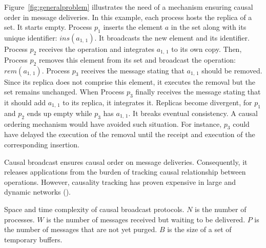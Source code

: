 Figure~\ref{fig:generalproblem} illustrates the need of a mechanism ensuring
causal order in message deliveries. %
In this example, each process hosts the replica of a set. It starts
empty. Process $p_1$ inserts the element $a$ in the set along with its unique
identifier: $ins(a_{1,\,1})$. It broadcasts the new element and its
identifier. Process $p_2$ receives the operation and integrates $a_{1,\,1}$ to
its own copy. Then, Process $p_2$ removes this element from its set and
broadcast the operation: $rem(a_{1,\,1})$. Process $p_3$ receives the message
stating that $a_{1,\,1}$ should be removed. Since its replica does not comprise
this element, it executes the removal but the set remains unchanged. When
Process $p_3$ finally receives the message stating that it should add
$a_{1,\,1}$ to its replica, it integrates it. Replicas become divergent, for
$p_1$ and $p_2$ ends up empty while $p_3$ has $a_{1,\,1}$. It breaks eventual
consistency. A causal ordering mechanism would have avoided such situation. For
instance, $p_3$ could have delayed the execution of the removal until the
receipt and execution of the corresponding insertion.

Causal broadcast ensures causal order on message deliveries. Consequently, it
releases applications from the burden of tracking causal relationship between
operations. However, causality tracking has proven expensive in large and
dynamic networks (\REF).

\begin{table}
  \caption{\label{table:comparison} Space and time complexity of causal broadcast protocols. $N$ is the number of processes. $W$ is the number of messages received but waiting to be delivered.
    $P$ is the number of messages that are not yet purged.
    $B$ is the size of a set of temporary buffers.}
  
\end{table}


